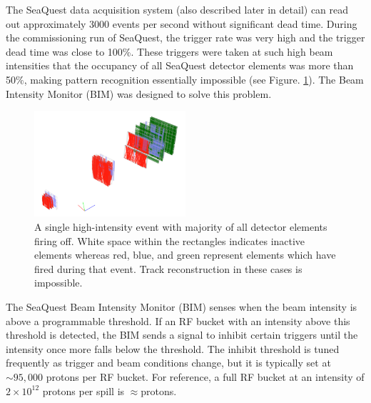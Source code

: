 The SeaQuest data acquisition system (also described later in detail) can read out approximately 3000 events per second without significant dead time.  During the commissioning run of SeaQuest, the trigger rate was very high and the trigger dead time was close to 100\%.  These triggers were taken at such high beam intensities that the occupancy of all SeaQuest detector elements was more than 50$\%$, making pattern recognition essentially impossible (see Figure. \ref{fig:splat}). The Beam Intensity Monitor (BIM) was designed to solve this problem.

\begin{figure}
	\begin{center}
		\includegraphics[width=0.5\textwidth]{figures/apparatus/splat2.png}
		\caption{A single high-intensity event with majority of all detector elements firing off. White space within the rectangles indicates inactive elements whereas red, blue, and green represent elements which have fired during that event. Track reconstruction in these cases is impossible.}
		\label{fig:splat}
	\end{center}
\end{figure}

The SeaQuest Beam Intensity Monitor (BIM) senses when the beam intensity is above a programmable threshold. If an RF bucket with an intensity above this threshold is detected, the BIM sends a signal to inhibit certain triggers until the intensity once more falls below the threshold. The inhibit threshold is tuned frequently as trigger and beam conditions change, but it is typically set at $\sim95,000$ protons per RF bucket. For reference, a full RF bucket at an intensity of $2\times 10^{12}$ protons per spill is $\approx$\unit[10,000]{protons}.


